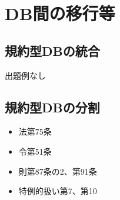 \section{DB間の移行等}

\subsection{規約型DBの統合}

出題例なし

\newpage

\subsection{規約型DBの分割}

\begin{InyouJobunbox}
  \begin{itemize}
    \item 法第75条
    \item 令第51条
    \item 則第87条の2、第91条
    \item 特例的扱い第7、第10
  \end{itemize}
\end{InyouJobunbox}


